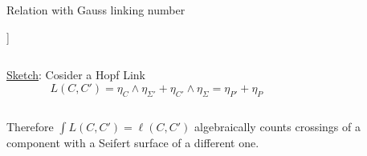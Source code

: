 \documentclass[beamer,10pt]{standalone}
\begin{document}
\begin{frame}{Relation with Gauss linking number}
\begin{propblock}
		]
	\pause
  	\begin{columns}
		\begin{column}[c]{.7\linewidth}	
		\underline{Sketch}: Cosider a Hopf Link
			\begin{displaymath}
				L(C,C') = \eta_C \wedge \eta_{\Sigma'} + \eta_{C'} \wedge \eta_\Sigma =
				\eta_{P'} + \eta_{P}
			\end{displaymath}
		\end{column}
		\begin{column}[c]{.25\linewidth}	
		\end{column}
  	\end{columns}
			Therefore $\int L(C,C') = \ell(C,C')$ 
			algebraically counts crossings of a component with a Seifert surface of a different one.			%
		\end{propblock}
		
\end{frame}
\end{document}
